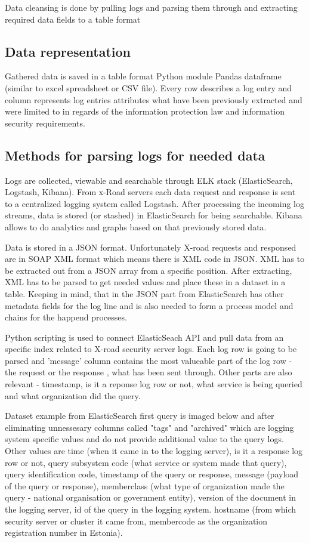 \documentclass[a4paper, 12pt]{article}
\begin{document}
Data cleansing is done by pulling logs and parsing them through and extracting required data fields to a table format 

\subsection{Data representation}
Gathered data is saved in a table format Python module Pandas dataframe (similar to excel spreadsheet or CSV file). Every row describes a log entry and column represents log entries attributes what have been previously extracted and were limited to in regards of the information protection law and information security requirements. 

\subsection{Methods for parsing logs for needed data}
Logs are collected, viewable and searchable through ELK stack (ElasticSearch, Logstash, Kibana). From x-Road servers each data request and response is sent to a centralized logging system called Logstash. After processing the incoming log streams, data is stored (or stashed) in ElasticSearch for being searchable. Kibana allows to do analytics and graphs based on that previously stored data. 

Data is stored in a JSON format. Unfortunately X-road requests and responsed are in SOAP XML format which means there is XML code in JSON. XML has to be extracted out from a JSON array from a specific position. After extracting, XML has to be parsed to get needed values and place these in a dataset in a table. Keeping in mind, that in the JSON part from ElasticSearch has other metadata fields for the log line and is also needed to form a process model and chains for the happend processes. 

Python scripting is used to connect ElasticSeach API and pull data from an specific index related to X-road security server logs. Each log row is going to be parsed and 'message' column contains the most valueable part of the log row -  the request or the response , what has been sent through. Other parts are also relevant - timestamp, is it a reponse log row or not, what service is being queried and what organization did the query. 

Dataset example from ElasticSearch first query is imaged below and after eliminating unnessesary columns called "tags" and "archived" which are logging system specific values and do not provide additional value to the query logs. Other values are time (when it came in to the logging server), is it a response log row or not, query subsystem code (what service or system made that query), query identification code, timestamp of the query or response, message (payload of the query or response), memberclass (what type of organization made the query - national organisation or government entity), version of the document in the logging server, id of the query in the logging system. hostname (from which security server or cluster it came from, membercode as the organization registration number in Estonia). 
\end{document}

